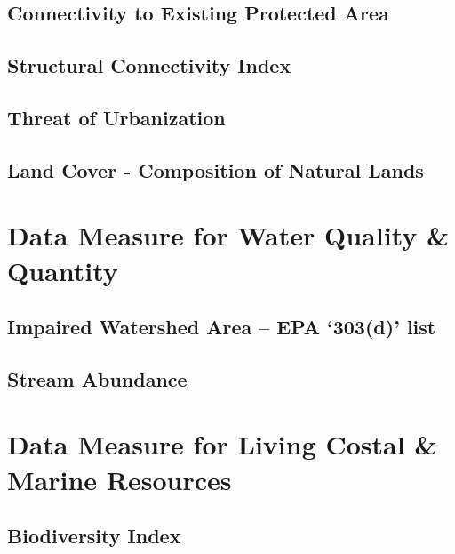 \documentclass[]{book}
\begin{document}
\hypertarget{connectivity-to-existing-protected-area}{%
\section{Connectivity to Existing Protected Area}\label{connectivity-to-existing-protected-area}}

\hypertarget{structural-connectivity-index}{%
\section{Structural Connectivity Index}\label{structural-connectivity-index}}

\hypertarget{threat-of-urbanization}{%
\section{Threat of Urbanization}\label{threat-of-urbanization}}

\hypertarget{land-cover---composition-of-natural-lands}{%
\section{Land Cover - Composition of Natural Lands}\label{land-cover---composition-of-natural-lands}}

\hypertarget{wq}{%
\chapter{Data Measure for Water Quality \& Quantity}\label{wq}}

\hypertarget{impaired-watershed-area-epa-303d-list}{%
\section{Impaired Watershed Area -- EPA `303(d)' list}\label{impaired-watershed-area-epa-303d-list}}

\hypertarget{stream-abundance}{%
\section{Stream Abundance}\label{stream-abundance}}

\hypertarget{lcmr}{%
\chapter{Data Measure for Living Costal \& Marine Resources}\label{lcmr}}

\hypertarget{biodiversity-index}{%
\section{Biodiversity Index}\label{biodiversity-index}}
\end{document}
